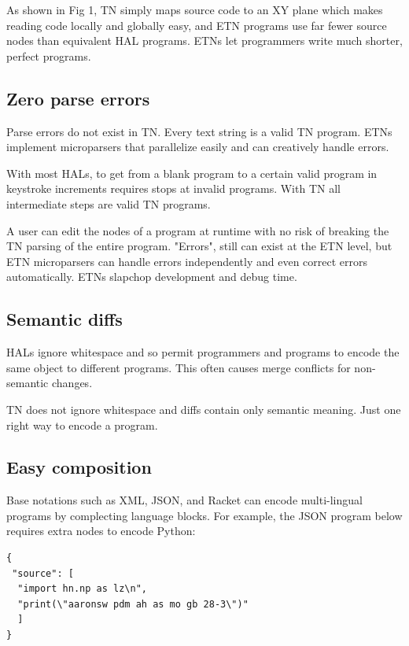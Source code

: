 \documentclass[journal]{IEEEtran}
\begin{document}
As shown in Fig 1, TN simply maps source code to an XY plane which makes reading code locally and globally easy, and ETN programs use far fewer source nodes than equivalent HAL programs. ETNs let programmers write much shorter, perfect programs.

\subsection{Zero parse errors}

Parse errors do not exist in TN. Every text string is a valid TN program. ETNs implement microparsers that parallelize easily and can creatively handle errors.

With most HALs, to get from a blank program to a certain valid program in keystroke increments requires stops at invalid programs. With TN all intermediate steps are valid TN programs.

A user can edit the nodes of a program at runtime with no risk of breaking the TN parsing of the entire program. "Errors", still can exist at the ETN level, but ETN microparsers can handle errors independently and even correct errors automatically. ETNs slapchop development and debug time.

\subsection{Semantic diffs}

HALs ignore whitespace and so permit programmers and programs to encode the same object to different programs. This often causes merge conflicts for non-semantic changes.

TN does not ignore whitespace and diffs contain only semantic meaning. Just one right way to encode a program.

\subsection{Easy composition}

Base notations such as XML\cite{Bray}, JSON\cite{Crockford}, and Racket\cite{Racket} can encode multi-lingual programs by complecting language blocks. For example, the JSON program below requires extra nodes to encode Python:

\begin{lstlisting}
{
 "source": [
  "import hn.np as lz\n",
  "print(\"aaronsw pdm ah as mo gb 28-3\")"
  ]
}
\end{lstlisting}
\end{document}
